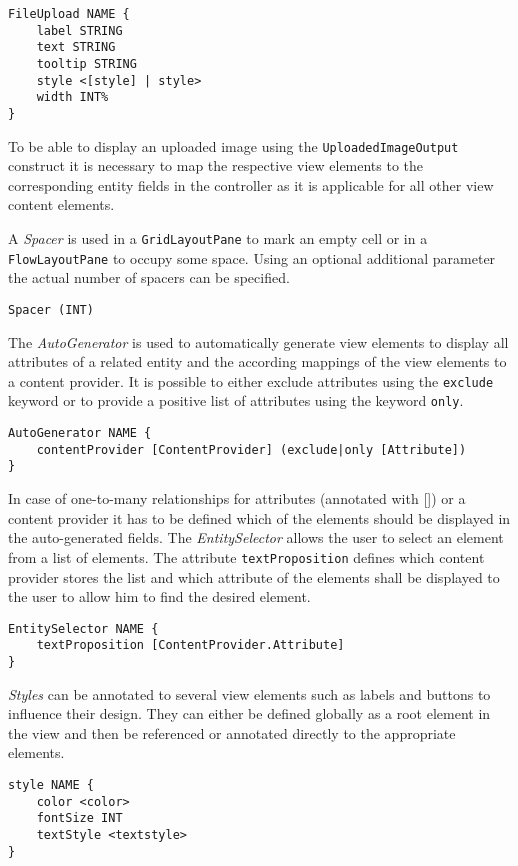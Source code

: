 \begin{lstlisting}
FileUpload NAME {
	label STRING
	text STRING
	tooltip STRING		
	style <[style] | style>
	width INT%
}	
\end{lstlisting}

To be able to display an uploaded image using the \lstinline!UploadedImageOutput! construct it is necessary to map the respective view elements to the corresponding entity fields in the controller as it is applicable for all other view content elements. 

A \textit{Spacer} is used in a \lstinline!GridLayoutPane! to mark an empty cell or in a \lstinline!FlowLayoutPane! to occupy some space. Using an optional additional parameter the actual number of spacers can be specified.
\begin{lstlisting}
Spacer (INT)
\end{lstlisting}

The \textit{AutoGenerator} is used to automatically generate view elements to display all attributes of a related entity and the according mappings of the view elements to a content provider. It is possible to either exclude attributes using the \lstinline!exclude! keyword or to provide a positive list of attributes using the keyword \lstinline!only!.
\begin{lstlisting}
AutoGenerator NAME {
	contentProvider [ContentProvider] (exclude|only [Attribute])
}
\end{lstlisting}

In case of one-to-many relationships for attributes (annotated with []) or a content provider it has to be defined which of the elements should be displayed in the auto-generated fields. The \textit{EntitySelector} allows the user to select an element from a list of elements. The attribute \lstinline!textProposition! defines which content provider stores the list and which attribute of the elements shall be displayed to the user to allow him to find the desired element.
\begin{lstlisting}
EntitySelector NAME {
	textProposition [ContentProvider.Attribute]
}
\end{lstlisting}

\textit{Styles} can be annotated to several view elements such as labels and buttons to influence their design. They can either be defined globally as a root element in the view and then be referenced or annotated directly to the appropriate elements.
\begin{lstlisting}
style NAME {
	color <color>
	fontSize INT
	textStyle <textstyle>
}
\end{lstlisting}

